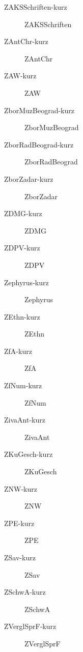 \begin{footnotesize}
\begin{description}
 \item[ZAKSSchriften-kurz] ZAKSSchriften 
 \item[ZAntChr-kurz] ZAntChr 
 \item[ZAW-kurz] ZAW 
 \item[ZborMuzBeograd-kurz] ZborMuzBeograd 
 \item[ZborRadBeograd-kurz] ZborRadBeograd 
 \item[ZborZadar-kurz] ZborZadar 
 \item[ZDMG-kurz] ZDMG 
 \item[ZDPV-kurz] ZDPV 
 \item[Zephyrus-kurz] Zephyrus 
 \item[ZEthn-kurz] ZEthn 
 \item[ZfA-kurz] ZfA 
 \item[ZfNum-kurz] ZfNum 
 \item[ZivaAnt-kurz] ZivaAnt 
 \item[ZKuGesch-kurz] ZKuGesch 
 \item[ZNW-kurz] ZNW 
 \item[ZPE-kurz] ZPE 
 \item[ZSav-kurz] ZSav 
 \item[ZSchwA-kurz] ZSchwA 
 \item[ZVerglSprF-kurz] ZVerglSprF
\end{description}
\end{footnotesize}